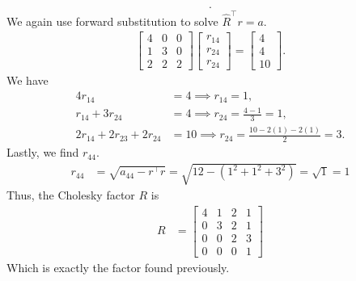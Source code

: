 \documentclass{report}
\begin{document}
\begin{remark}
\begin{align*}
    .\end{align*}
    We again use forward substitution to solve $\hat{R}^{\top} r = a$.
    \begin{align*}
        \begin{bmatrix}
            4 & 0 & 0 \\
            1 & 3 & 0 \\
            2 & 2 & 2
        \end{bmatrix}
        \begin{bmatrix}
            r_{14} \\ r_{24} \\ r_{24} 
        \end{bmatrix}
        = \begin{bmatrix}
            4 \\ 4 \\ 10
        \end{bmatrix}
    .\end{align*}
    We have
    \begin{align*}
        4r_{14} &= 4 \implies r_{14} = 1, \\
        r_{14} + 3r_{24} &= 4 \implies r_{24} = \frac{4-1}{3} = 1, \\
        2r_{14} + 2 r_{23} + 2r_{24} &= 10 \implies r_{24} = \frac{10-2(1)-2(1)}{2} = 3
    .\end{align*}
    Lastly, we find $r_{44}$.
    \begin{align*}
        r_{44} &=\sqrt{a_{44} - r^{\top}r}   = \sqrt{12 - (1^{2} + 1^{2} + 3^{2} )} = \sqrt{1} =1
    \end{align*}
    Thus, the Cholesky factor $R$ is 
    \begin{align*}
            R &= \begin{bmatrix} 4 & 1 & 2 & 1 \\ 0 & 3 & 2 & 1 \\ 0 & 0 & 2 & 3 \\ 0 & 0 & 0 &1 \end{bmatrix} 
    \end{align*}
    Which is exactly the factor found previously.
    




\end{remark}
\end{document}
